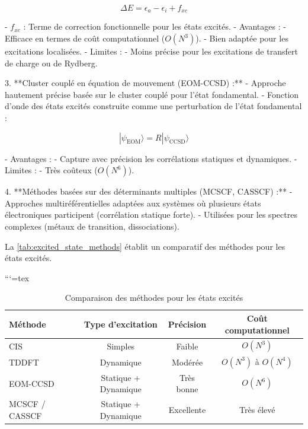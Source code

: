\documentclass[12pt,a4paper]{report}
\begin{document}
\begin{markdown}
\[
\Delta E = \epsilon_a - \epsilon_i + f_{xc}
\]

   - \(f_{xc}\) : Terme de correction fonctionnelle pour les états excités.
   - Avantages :
     - Efficace en termes de coût computationnel (\(O(N^3)\)).
     - Bien adaptée pour les excitations localisées.
   - Limites :
     - Moins précise pour les excitations de transfert de charge ou de Rydberg.

3. **Cluster couplé en équation de mouvement (EOM-CCSD) :**
   - Approche hautement précise basée sur le cluster couplé pour l’état fondamental.
   - Fonction d’onde des états excités construite comme une perturbation de l’état fondamental :

\[
|\psi_{\text{EOM}}\rangle = R |\psi_{\text{CCSD}}\rangle
\]

   - Avantages :
     - Capture avec précision les corrélations statiques et dynamiques.
   - Limites :
     - Très coûteux (\(O(N^6)\)).

4. **Méthodes basées sur des déterminants multiples (MCSCF, CASSCF) :**
   - Approches multiréférentielles adaptées aux systèmes où plusieurs états électroniques participent (corrélation statique forte).
   - Utilisées pour les spectres complexes (métaux de transition, dissociations).

La \autoref{tab:excited_state_methods} établit un comparatif des méthodes pour les états excités.

```{=tex}
\begin{table}[h!]
\centering
\caption{Comparaison des méthodes pour les états excités}
\begin{tabular}{@{}lccc@{}}
\toprule
\textbf{Méthode}         & \textbf{Type d’excitation}   & \textbf{Précision}   & \textbf{Coût computationnel} \\ \midrule
CIS                      & Simples                     & Faible               & $O(N^3)$                     \\
TDDFT                    & Dynamique                   & Modérée              & $O(N^3)$ à $O(N^4)$          \\
EOM-CCSD                 & Statique + Dynamique        & Très bonne           & $O(N^6)$                     \\
MCSCF / CASSCF           & Statique + Dynamique        & Excellente           & Très élevé                    \\ \bottomrule
\end{tabular}
\label{tab:excited_state_methods}
\end{table}



\end{markdown}
\end{document}
